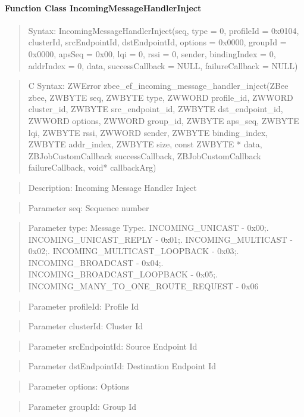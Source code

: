 \paragraph{Function Class IncomingMessageHandlerInject}
\begin{quote}Syntax: IncomingMessageHandlerInject(seq, type = 0, profileId = 0x0104, clusterId, srcEndpointId, dstEndpointId, options = 0x0000, groupId = 0x0000, apsSeq = 0x00, lqi = 0, rssi = 0, sender, bindingIndex = 0, addrIndex = 0, data, successCallback = NULL, failureCallback = NULL)\end{quote}
\begin{quote}C Syntax: ZWError zbee\_ef\_incoming\_message\_handler\_inject(ZBee zbee, ZWBYTE seq, ZWBYTE type, ZWWORD profile\_id, ZWWORD cluster\_id, ZWBYTE src\_endpoint\_id, ZWBYTE dst\_endpoint\_id, ZWWORD options, ZWWORD group\_id, ZWBYTE aps\_seq, ZWBYTE lqi, ZWBYTE rssi, ZWWORD sender, ZWBYTE binding\_index, ZWBYTE addr\_index, ZWBYTE size, const ZWBYTE * data, ZBJobCustomCallback successCallback, ZBJobCustomCallback failureCallback, void* callbackArg)\end{quote}
\begin{quote}Description: Incoming Message Handler Inject\end{quote}
\begin{quote}Parameter seq: Sequence number\end{quote}
\begin{quote}Parameter type: Message Type:. INCOMING\_UNICAST - 0x00;. INCOMING\_UNICAST\_REPLY - 0x01;. INCOMING\_MULTICAST - 0x02;. INCOMING\_MULTICAST\_LOOPBACK - 0x03;. INCOMING\_BROADCAST - 0x04;. INCOMING\_BROADCAST\_LOOPBACK - 0x05;. INCOMING\_MANY\_TO\_ONE\_ROUTE\_REQUEST - 0x06\end{quote}
\begin{quote}Parameter profileId: Profile Id\end{quote}
\begin{quote}Parameter clusterId: Cluster Id\end{quote}
\begin{quote}Parameter srcEndpointId: Source Endpoint Id\end{quote}
\begin{quote}Parameter dstEndpointId: Destination Endpoint Id\end{quote}
\begin{quote}Parameter options: Options\end{quote}
\begin{quote}Parameter groupId: Group Id\end{quote}
